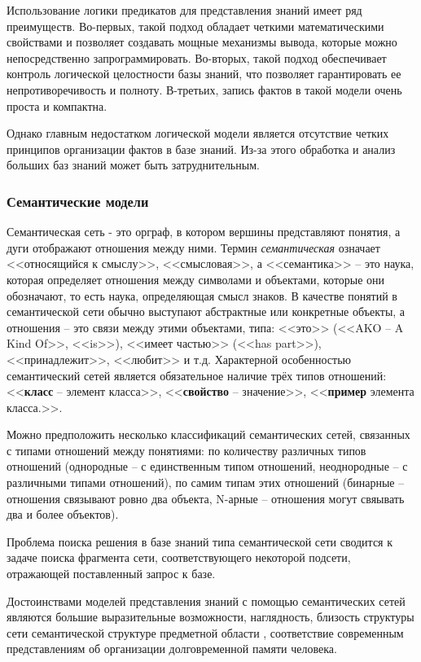 Использование логики предикатов для представления знаний имеет ряд преимуществ. Во-первых, такой подход обладает четкими математическими свойствами и позволяет создавать мощные механизмы вывода, которые можно непосредственно запрограммировать. Во-вторых, такой подход обеспечивает контроль логической целостности базы знаний, что позволяет гарантировать ее непротиворечивость и полноту. В-третьих, запись фактов в такой модели очень проста и компактна.

Однако главным недостатком логической модели является отсутствие четких принципов организации фактов в базе знаний. Из-за этого обработка и анализ больших баз знаний может быть затруднительным. \cite[с.~15]{Model_Baryshev}

\subsubsection{Семантические модели}

Семантическая сеть - это орграф, в котором вершины представляют понятия, а дуги отображают отношения между ними. Термин \textit{семантическая} означает <<относящийся к смыслу>>, <<смысловая>>, а <<семантика>> -- это наука, которая определяет отношения между символами и объектами, которые они обозначают, то есть наука, определяющая смысл знаков. В качестве понятий в семантической сети обычно выступают абстрактные или конкретные объекты, а отношения -- это связи между этими объектами, типа: <<это>> (<<AKO -- A Kind Of>>, <<is>>), <<имеет частью>> (<<has part>>), <<принадлежит>>, <<любит>> и т.д. Характерной особенностью семантический сетей является обязательное наличие трёх типов отношений: <<\textbf{класс} -- элемент класса>>, <<\textbf{свойство} -- значение>>, <<\textbf{пример} элемента класса.>>.

Можно предположить несколько классификаций семантических сетей, связанных с типами отношений между понятиями: по количеству различных типов отношений (однородные -- с единственным типом отношений, неоднородные -- с различными типами отношений), по самим типам этих отношений (бинарные -- отношения связывают ровно два объекта, N-арные -- отношения могут свяывать два и более объектов).

Проблема поиска решения в базе знаний типа семантической сети сводится к задаче поиска фрагмента сети, соответствующего некоторой подсети, отражающей поставленный запрос к базе. \cite[с.~22-23]{KBIS_Gavrilova}

Достоинствами моделей представления знаний с помощью семантических сетей являются большие выразительные возможности, наглядность, близость структуры сети семантической структуре предметной области \cite[с.~18]{Model_Baryshev}, соответствие современным представлениям об организации долговременной памяти человека. \cite[с.~23]{KBIS_Gavrilova}

